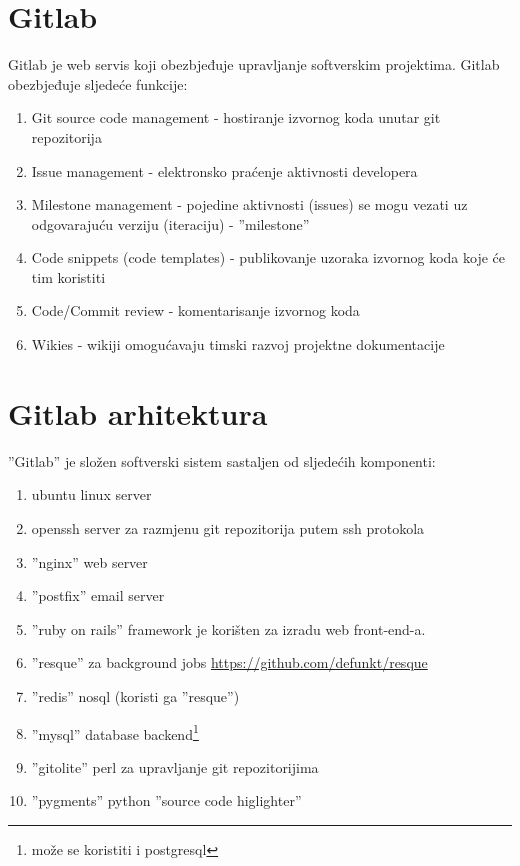 \documentclass[times, utf8, seminar]{fit}
\begin{document}
\section{Gitlab}
Gitlab je web servis koji obezbjeđuje upravljanje softverskim projektima. Gitlab obezbjeđuje sljedeće funkcije:
\begin{enumerate}
  \item Git source code management - hostiranje izvornog koda unutar git repozitorija
  \item Issue management - elektronsko praćenje aktivnosti developera
  \item Milestone management - pojedine aktivnosti (issues) se mogu vezati uz odgovarajuću verziju (iteraciju) - ''milestone''
  \item Code snippets (code templates) - publikovanje uzoraka izvornog koda koje će tim koristiti
  \item Code/Commit review - komentarisanje izvornog koda
  \item Wikies - wikiji omogućavaju timski razvoj projektne dokumentacije
\end{enumerate}

\section{Gitlab arhitektura}
''Gitlab'' je složen softverski sistem sastaljen od sljedećih komponenti:
\begin{enumerate}
  \item ubuntu linux server
  \item openssh server za razmjenu git repozitorija putem ssh protokola 
  \item ''nginx'' web server
  \item ''postfix'' email server
  \item ''ruby on rails'' framework je korišten za izradu web front-end-a.
  \item ''resque'' za background jobs \url{https://github.com/defunkt/resque}
  \item ''redis'' nosql (koristi ga ''resque'')
  \item ''mysql'' database backend\footnote{može se koristiti i postgresql}
  \item ''gitolite'' perl za upravljanje git repozitorijima
  \item ''pygments'' python ''source code higlighter''
\end{enumerate}
\end{document}
